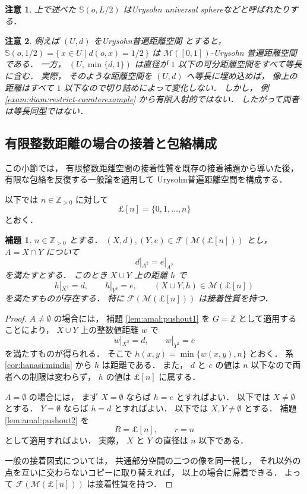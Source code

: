 \documentclass[leqno, 12pt]{jsarticle}
\newtheorem{lem}[thm]{補題}
\newtheorem*{rmk}{注意}
\newcommand{\zz}{\mathbb{Z}}
\newcommand{\Met}[1]{\mathscr{M}(#1)}
\newcommand{\FinitePart}[1]{\mathscr{F}(#1)}
\newcommand{\FinMet}[1]{\FinitePart{\Met{#1}}}
\newcommand{\restr}[2]{#1|_{#2}}
\newcommand{\pospart}[1]{#1_{>0}}
\newcommand{\zzpos}{\pospart{\zz}}
\newcommand{\Sphere}[2]{\mathbb{S}(#1,#2)}
\newcommand{\Rint}[1]{\mathsterling[#1]}
\begin{document}
\begin{rmk}\label{rmk:diameter:universal-sphere-name}
上で述べた
$\Sphere{o}{L/2}$
はUrysohn universal sphereなどと呼ばれたりする．
\end{rmk}

\begin{rmk}\label{rmk:diameter:sphere-example}
例えば
$(U, d)$
をUrysohn普遍距離空間
とすると，
$\Sphere{o}{1/2}=\{\,x\in U  \mid d(o, x)=1/2\, \}$
は
$\Met{[0,1]}$-Urysohn
普遍距離空間である．
一方，
$(U, \min\{d, 1\})$
は直径が
$1$
以下の可分距離空間をすべて等長に含む．
実際，
そのような距離空間を
$(U,d)$
へ等長に埋め込めば，
像上の距離はすべて
$1$
以下なので切り詰めによって変化しない．
しかし，
例
\ref{exam:diam:restrict-counterexample}
から有限入射的ではない．
したがって両者は等長同型ではない．
\end{rmk}


\subsection{有限整数距離の場合の接着と包絡構成}\label{subsec:bounded:finite-integer}

この小節では，
有限整数距離空間の接着性質を既存の接着補題から導いた後，
有限な包絡を反復する一般論を適用して
Urysohn普遍距離空間を構成する．

以下では
$n\in\zzpos$
に対して
\[
\Rint{n}=\{0,1,\dots,n\}
\]
とおく．

\begin{lem}\label{lem:diam:integer-amalgamation}
$n\in\zzpos$
とする．
$(X,d),(Y,e)\in\FinMet{\Rint{n}}$
とし，
$A=X\cap Y$
について
\[
\restr{d}{A^2}=\restr{e}{A^2}
\]
を満たすとする．
このとき
$X\cup Y$
上の距離
$h$
で
\[
\restr{h}{X^2}=d,
\qquad
\restr{h}{Y^2}=e,
\qquad
(X\cup Y,h)\in\Met{\Rint{n}}
\]
を満たすものが存在する．
特に
$\FinMet{\Rint{n}}$
は接着性質を持つ．
\end{lem}
\begin{proof}
$A\neq\emptyset$
の場合には，
補題
\ref{lem:amal:pushout1}
を
$G=\zz$
として適用することにより，
$X\cup Y$
上の整数値距離
$w$
で
\[
\restr{w}{X^2}=d,
\qquad
\restr{w}{Y^2}=e
\]
を満たすものが得られる．
そこで
$h(x,y)=\min\{w(x,y),n\}$
とおく．
系
\ref{cor:hanasi:mindis}
から
$h$
は距離である．
また，
$d$
と
$e$
の値は
$n$
以下なので両者への制限は変わらず，
$h$
の値は
$\Rint{n}$
に属する．

$A=\emptyset$
の場合には，
まず
$X=\emptyset$
ならば
$h=e$
とすればよい．
以下では
$X\neq\emptyset$
とする．
$Y=\emptyset$
ならば
$h=d$
とすればよい．
以下では
$X,Y\neq\emptyset$
とする．
補題
\ref{lem:amal:pushout2}
を
\[
R=\Rint{n},
\qquad
r=n
\]
として適用すればよい．
実際，
$X$
と
$Y$
の直径は
$n$
以下である．

一般の接着図式については，
共通部分空間の二つの像を同一視し，
それ以外の点を互いに交わらないコピーに取り替えれば，
以上の場合に帰着できる．
よって
$\FinMet{\Rint{n}}$
は接着性質を持つ．
\end{proof}
\end{document}
